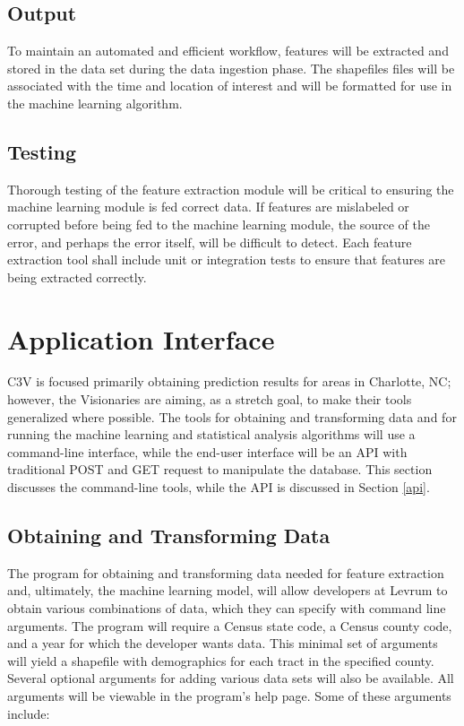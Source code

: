 \documentclass[onecolumn, draftclsnofoot,10pt, compsoc]{IEEEtran}
\begin{document}
\begin{singlespace}
    \subsection{Output}
    To maintain an automated and efficient workflow, features will be extracted and stored in the data set during the data ingestion phase. 
    The shapefiles files will be associated with the time and location of interest and will be formatted for use in the machine learning algorithm.
	
	\subsection{Testing} \label{fetesting}
	Thorough testing of the feature extraction module will be critical to ensuring the machine learning module is fed correct data.
	If features are mislabeled or corrupted before being fed to the machine learning module, the source of the error, and perhaps the error itself, will be difficult to detect.
	Each feature extraction tool shall include unit or integration tests to ensure that features are being extracted correctly.

\section{Application Interface} \label{application_interface}
C3V is focused primarily obtaining prediction results for areas in Charlotte, NC; however, the Visionaries are aiming, as a stretch goal, to make their tools generalized where possible.
The tools for obtaining and transforming data and for running the machine learning and statistical analysis algorithms will use a command-line interface, while the end-user interface will be an API with traditional POST and GET request to manipulate the database. This section discusses the command-line tools, while the API is discussed in Section \ref{api}.

    \subsection{Obtaining and Transforming Data}
    The program for obtaining and transforming data needed for feature extraction and, ultimately, the machine learning model, will allow developers at Levrum to obtain various combinations of data, which they can specify with command line arguments. The program will require a Census state code, a Census county code, and a year for which the developer wants data. This minimal set of arguments will yield a shapefile with demographics for each tract in the specified county. Several optional arguments for adding various data sets will also be available. All arguments will be viewable in the program's help page. Some of these arguments include:
    

\end{singlespace}
\end{document}
